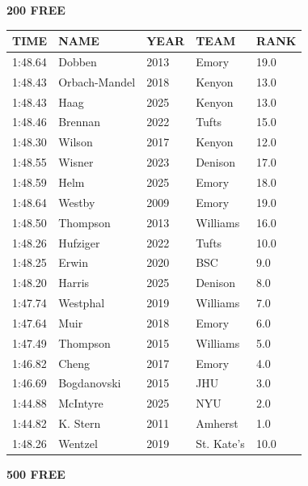 \begin{table}[H]
\centering
\begin{minipage}[t]{0.48\textwidth}
\centering
\textbf{200 FREE}\\[0.1cm]
\begin{tabular}{@{}p{1.8cm}p{2.8cm}p{1.2cm}p{1.4cm}p{0.8cm}@{}}
\hline
    \textbf{TIME} & \textbf{NAME} & \textbf{YEAR} & \textbf{TEAM} & \textbf{RANK} \\
\hline
    1:48.64 & Dobben & 2013 & Emory & 19.0 \\
    1:48.43 & Orbach-Mandel & 2018 & Kenyon & 13.0 \\
    1:48.43 & Haag & 2025 & Kenyon & 13.0 \\
    1:48.46 & Brennan & 2022 & Tufts & 15.0 \\
    1:48.30 & Wilson & 2017 & Kenyon & 12.0 \\
    1:48.55 & Wisner & 2023 & Denison & 17.0 \\
    1:48.59 & Helm & 2025 & Emory & 18.0 \\
    1:48.64 & Westby & 2009 & Emory & 19.0 \\
    1:48.50 & Thompson & 2013 & Williams & 16.0 \\
    1:48.26 & Hufziger & 2022 & Tufts & 10.0 \\
    1:48.25 & Erwin & 2020 & BSC & 9.0 \\
    1:48.20 & Harris & 2025 & Denison & 8.0 \\
    1:47.74 & Westphal & 2019 & Williams & 7.0 \\
    1:47.64 & Muir & 2018 & Emory & 6.0 \\
    1:47.49 & Thompson & 2015 & Williams & 5.0 \\
    1:46.82 & Cheng & 2017 & Emory & 4.0 \\
    1:46.69 & Bogdanovski & 2015 & JHU & 3.0 \\
    1:44.88 & McIntyre & 2025 & NYU & 2.0 \\
    1:44.82 & K. Stern & 2011 & Amherst & 1.0 \\
    1:48.26 & Wentzel & 2019 & St. Kate's & 10.0 \\
\hline
\end{tabular}
\end{minipage}\hfill
\begin{minipage}[t]{0.48\textwidth}
\centering
\textbf{500 FREE}\\[0.1cm]
\begin{tabular}{@{}p{1.8cm}p{2.8cm}p{1.2cm}p{1.4cm}p{0.8cm}@{}}

\end{tabular}
\end{minipage}
\end{table}
